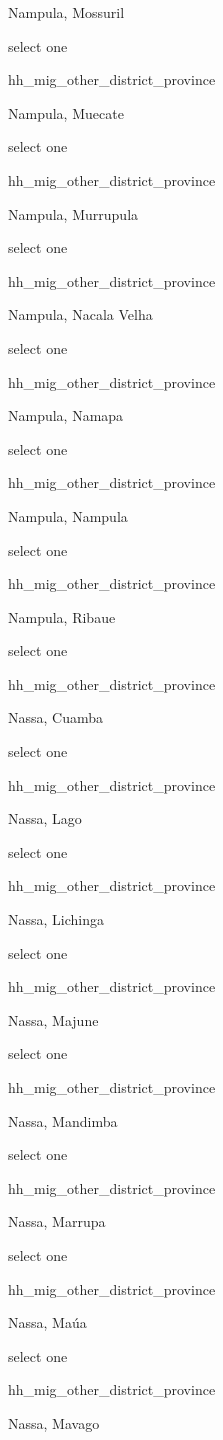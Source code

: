 \documentclass[]{article}
\begin{document}
Nampula, Mossuril

select one

hh\_mig\_other\_district\_province

Nampula, Muecate

select one

hh\_mig\_other\_district\_province

Nampula, Murrupula

select one

hh\_mig\_other\_district\_province

Nampula, Nacala Velha

select one

hh\_mig\_other\_district\_province

Nampula, Namapa

select one

hh\_mig\_other\_district\_province

Nampula, Nampula

select one

hh\_mig\_other\_district\_province

Nampula, Ribaue

select one

hh\_mig\_other\_district\_province

Nassa, Cuamba

select one

hh\_mig\_other\_district\_province

Nassa, Lago

select one

hh\_mig\_other\_district\_province

Nassa, Lichinga

select one

hh\_mig\_other\_district\_province

Nassa, Majune

select one

hh\_mig\_other\_district\_province

Nassa, Mandimba

select one

hh\_mig\_other\_district\_province

Nassa, Marrupa

select one

hh\_mig\_other\_district\_province

Nassa, Maúa

select one

hh\_mig\_other\_district\_province

Nassa, Mavago
\end{document}
